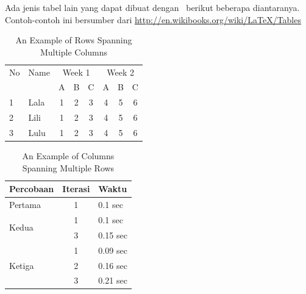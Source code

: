 Ada jenis tabel lain yang dapat dibuat dengan \latex~berikut beberapa diantaranya.
Contoh-contoh ini bersumber dari \url{http://en.wikibooks.org/wiki/LaTeX/Tables}

\begin{table}
	\centering
	\caption{An Example of Rows Spanning Multiple Columns}
	\label{row.spanning}
	\begin{tabular}{|l|l|*{6}{c|}}
		\hline %
		No & Name & \multicolumn{3}{|c|}{Week 1} & \multicolumn{3}{|c|}{Week 2}                 \\
		\cline{3-8} %
		   &      & A                            & B                            & C & A & B & C \\
		\hline
		1  & Lala & 1                            & 2                            & 3 & 4 & 5 & 6 \\
		2  & Lili & 1                            & 2                            & 3 & 4 & 5 & 6 \\
		3  & Lulu & 1                            & 2                            & 3 & 4 & 5 & 6 \\
		\hline
	\end{tabular}
\end{table}

\begin{table}
	\centering
	\caption{An Example of Columns Spanning Multiple Rows}
	\label{column.spanning}
	\begin{tabular}{|l|c|l|}
		\hline
		Percobaan               & Iterasi & Waktu    \\
		\hline
		Pertama                 & 1       & 0.1 sec  \\ \hline
		\multirow{2}{*}{Kedua}  & 1       & 0.1 sec  \\
		                        & 3       & 0.15 sec \\
		\hline
		\multirow{3}{*}{Ketiga} & 1       & 0.09 sec \\
		                        & 2       & 0.16 sec \\
		                        & 3       & 0.21 sec \\
		\hline
	\end{tabular}
\end{table}

